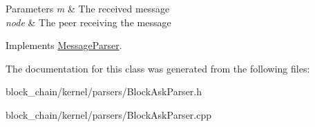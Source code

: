 \begin{DoxyParams}{Parameters}
{\em m} & The received message \\
\hline
{\em node} & The peer receiving the message \\
\hline
\end{DoxyParams}


Implements \mbox{\hyperlink{classMessageParser_a946f3b936dc01a75d6165329b159ecfe}{Message\+Parser}}.



The documentation for this class was generated from the following files\+:\begin{DoxyCompactItemize}
\item 
block\+\_\+chain/kernel/parsers/Block\+Ask\+Parser.\+h\item 
block\+\_\+chain/kernel/parsers/Block\+Ask\+Parser.\+cpp\end{DoxyCompactItemize}
